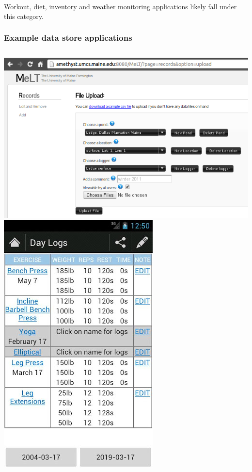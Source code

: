 \documentclass[]{beamer}
\begin{document}
\begin{frame}
Workout, diet, inventory and weather monitoring applications likely fall under
this category.
\frametitle{Example data store applications}
\begin{columns}
  \column{2.6in}
\includegraphics[width=\linewidth]{images/ex2.png}
\column{1.4in}
\includegraphics[width=\linewidth]{images/ex1.jpg}
\end{columns}
\end{frame}
\end{document}

